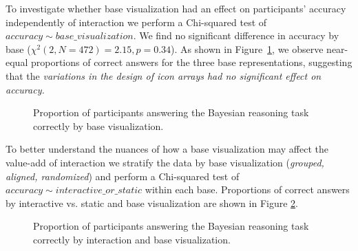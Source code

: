 To investigate whether base visualization had an effect on participants' accuracy independently of interaction we perform a Chi-squared test of $accuracy \sim base\_visualization$. We find no significant difference in accuracy by base ($\chi^2(2, N = 472) = 2.15, p = 0.34$). As shown in Figure~\ref{fig:exp1_bases}, we observe near-equal proportions of correct answers for the three base representations, suggesting that the \textit{variations in the design of icon arrays had no significant effect on accuracy.}

\begin{figure}[h!]
    \centering
    \caption{Proportion of participants answering the Bayesian reasoning task correctly by base visualization.}
    \label{fig:exp1_bases}
\end{figure}

To better understand the nuances of how a base visualization may affect the value-add of interaction we stratify the data by base visualization (\textit{grouped, aligned, randomized}) and perform a Chi-squared test of $accuracy \sim interactive\_or\_static$ within each base. Proportions of correct answers by interactive vs. static and base visualization are shown in Figure \ref{fig:exp1_static_vs_int_by_base}. 

\begin{figure}[h!]
    \centering
    \caption{Proportion of participants answering the Bayesian reasoning task correctly by interaction and base visualization.} 
    \label{fig:exp1_static_vs_int_by_base}
\end{figure}


